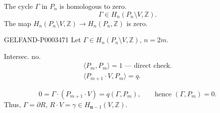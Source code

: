 The cycle $\Gamma$ in $P_n$ is homologous to zero.
\begin{equation*}\Gamma\in H_n (P_n\setminus V,\mathbb Z).\end{equation*}
The map $H_n (P_n\setminus V,\mathbb Z)\longrightarrow H_n (P_n,\mathbb Z)$ is zero.

\begin{GelfandAdjacentEvidence}{GELFAND-P000347}{1}
Let $\Gamma\in H_n (P_n\setminus V,\mathbb Z)$, $n=2m$.
\end{GelfandAdjacentEvidence}


Intersec. no.
\begin{gather*}\langle P_m, P_m\rangle=1\text{ --- direct check.}\\
\langle P_{m+1}\cdot V, P_m\rangle=q.\end{gather*}
\begin{center}\end{center}
\begin{equation*}0=\Gamma\cdot (P_{m+1}\cdot V)=q (\Gamma, P_m),\qquad\text{hence }(\Gamma, P_m)=0.\end{equation*}
Thus, $\Gamma=\partial R$, $R\cdot V=\gamma\in H_{\boldsymbol n-1}(V,\mathbb Z)$.



